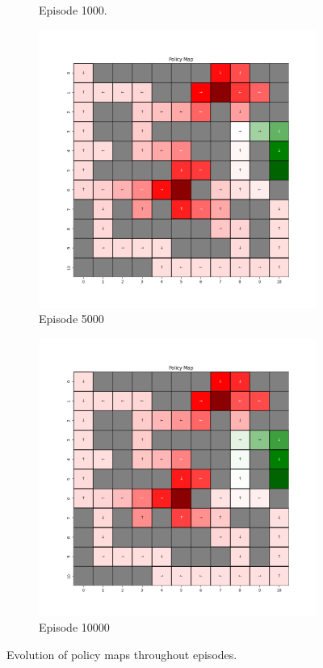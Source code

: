 \documentclass{assignment}
\begin{document}
\begin{figure}[H]
\begin{subfigure}{0.3\textwidth}
    \caption{Episode 1000.}
    \end{subfigure}\hfill
    \begin{subfigure}{0.3\textwidth}
        \includegraphics[width=\textwidth]{figures/policy_td/epsilon_sweep/policy_alpha_0.1_gamma_0.95_epsilon_0.8_iteration_5000.png}
    \caption{Episode 5000}
    \end{subfigure}\hfill
    \begin{subfigure}{0.3\textwidth}
        \includegraphics[width=\textwidth]{figures/policy_td/epsilon_sweep/policy_alpha_0.1_gamma_0.95_epsilon_0.8_iteration_10000.png}
    \caption{Episode 10000}
    \end{subfigure}
    \caption{Evolution of policy maps throughout episodes.}
    \label{fig:epsilon_0.8_td_learning_policy}
\end{figure}
\end{document}
